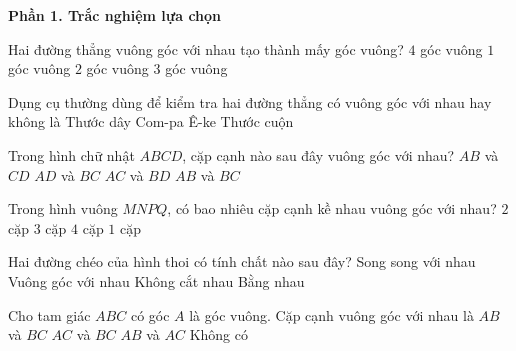 \textbf{Phần 1. Trắc nghiệm lựa chọn}

\begin{ex} %
Hai đường thẳng vuông góc với nhau tạo thành mấy góc vuông?
\choice
{\True $4$ góc vuông}
{$1$ góc vuông}
{$2$ góc vuông}
{$3$ góc vuông}
\end{ex}

\begin{ex} %
Dụng cụ thường dùng để kiểm tra hai đường thẳng có vuông góc với nhau hay không là
\choice
{Thước dây}
{Com-pa}
{\True Ê-ke}
{Thước cuộn}
\end{ex}

\begin{ex} %
Trong hình chữ nhật $ABCD$, cặp cạnh nào sau đây vuông góc với nhau?
\choice
{$AB$ và $CD$}
{$AD$ và $BC$}
{$AC$ và $BD$}
{\True $AB$ và $BC$}
\end{ex}

\begin{ex} %
Trong hình vuông $MNPQ$, có bao nhiêu cặp cạnh kề nhau vuông góc với nhau?
\choice
{$2$ cặp}
{$3$ cặp}
{\True $4$ cặp}
{$1$ cặp}
\end{ex}

\begin{ex} %
Hai đường chéo của hình thoi có tính chất nào sau đây?
\choice
{Song song với nhau}
{\True Vuông góc với nhau}
{Không cắt nhau}
{Bằng nhau}
\end{ex}

\begin{ex} %
Cho tam giác $ABC$ có góc $A$ là góc vuông. Cặp cạnh vuông góc với nhau là
\choice
{$AB$ và $BC$}
{$AC$ và $BC$}
{\True $AB$ và $AC$}
{Không có}
\end{ex}

